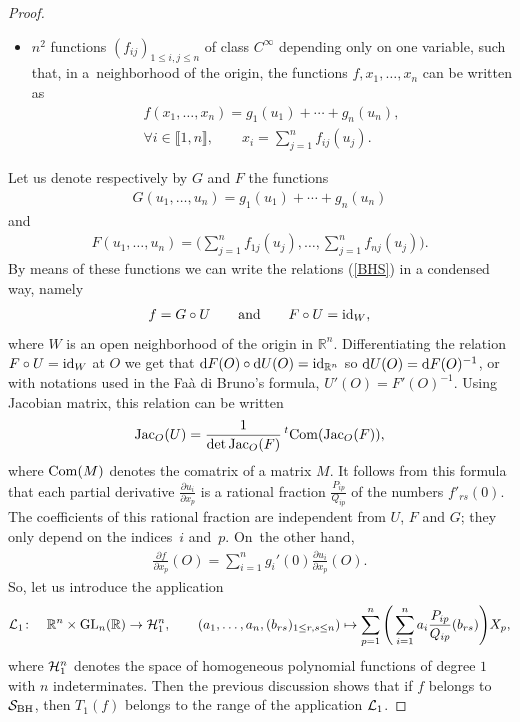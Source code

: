 \documentclass[pdftex]{sigma}%
\numberwithin{equation}{section}
\begin{document}
\begin{proof}
\begin{itemize}
\item $n^2$ functions $(f_{ij})_{1\leq i, j\leq n}$ of class $C^\infty$ depending only on one variable, such that, in a~neighborhood of the origin, the functions $f,x_1,\dots,x_n$ can be written as
	\begin{gather}
	f(x_1, \dots, x_n)=g_1(u_1)+\cdots+g_n(u_n),\nonumber
\\
\forall i\in\llbracket 1,n\rrbracket,\qquad x_i=\sum_{j=1}^nf_{ij}(u_j).\label{BHS}
	\end{gather}
\end{itemize}
	Let us denote respectively by $G$ and $F$ the functions
\begin{gather*}
G(u_1,\dots, u_n)=g_1(u_1)+\cdots+g_n(u_n)
\end{gather*}
and
\begin{gather*}
F(u_1,\dots, u_n)=\Bigg(\sum_{j=1}^nf_{1j}(u_j),\dots,\sum_{j=1}^nf_{nj}(u_j)\Bigg).
\end{gather*}
	By means of these functions we can write the relations (\ref{BHS}) in a condensed way, namely
\begin{gather*}
f=G\circ U\qquad \text{and}\qquad F\circ U={\rm id}_{W},
\end{gather*}
	where $W$ is an open neighborhood of the origin in $\mathbb{R}^n$.
	Differentiating the relation $F\circ U={\rm id}_{W}$ at $O$ we get that ${\rm d}F(O)\circ {\rm d}U(O)={\rm id}_{\mathbb{R}^n}$ so ${\rm d}U(O)={\rm d}F(O)^{-1}$, or with notations used in the Fa\`a di Bruno's formula, $U'(O)=F'(O)^{-1}$. Using Jacobian matrix, this relation can be written
\begin{gather*}
{\rm Jac}_O(U)=\frac{1}{\det{\rm Jac}_O(F)} \,{}^t{\rm Com}({\rm Jac}_O(F)),
\end{gather*}
	where ${\rm Com}(M)$ denotes the comatrix of a matrix $M$. It follows from this formula that each partial derivative $\frac{\partial u_i}{\partial x_p}$ is a rational fraction $\frac{P_{ip}}{Q_{ip}}$ of the numbers $f'_{rs}(0)$. The coefficients of this rational fraction are independent from $U$, $F$ and $G$; they only depend on the indices~$i$ and~$p$.
	On~the other hand,
\begin{gather*}
\frac{\partial f}{\partial x_p}(O)=\sum_{i=1}^ng_i'(0)\frac{\partial u_i}{\partial x_p}(O).
\end{gather*}
	So, let us introduce the application
\begin{gather*}
{\cal L}_1\colon\quad \mathbb{R}^n\times {\rm GL}_n(\mathbb{R})\to{\cal H}_1^n,\qquad
	(a_1,\dots,a_n,(b_{rs})_{1\leq r,s\leq n})\mapsto\sum_{p=1}^n\Bigg(\sum_{i=1}^n a_i\frac{P_{ip}}{Q_{ip}}(b_{rs}) \Bigg)X_p,
\end{gather*}
	where ${\cal H}_1^n$ denotes the space of homogeneous polynomial functions of degree $1$ with $n$ indeterminates. Then the previous discussion shows that if $f$ belongs to ${\cal S}_{\rm BH}$, then $T_1(f)$ belongs to the range of the application ${\cal L}_1$.
	

\end{proof}
\end{document}
